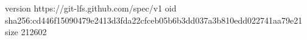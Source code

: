 version https://git-lfs.github.com/spec/v1
oid sha256:cd446f15090479e2413d3fda22cfceb05b6b3dd037a3b810edd022741aa79e21
size 212602
